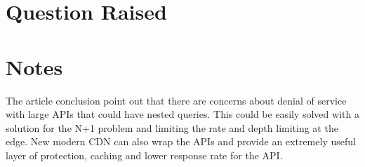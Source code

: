 \section{Question Raised}
\label{s:Question-Raised-2}

\section{Notes}
\label{s:Notes-2}
The article conclusion point out that there are concerns about denial of service
with large APIs that could have nested queries. This could be easily solved with
a solution for the N+1 problem and limiting the rate and depth limiting at the
edge. New modern CDN can also wrap the APIs and provide an extremely useful
layer of protection, caching and lower response rate for the API.
